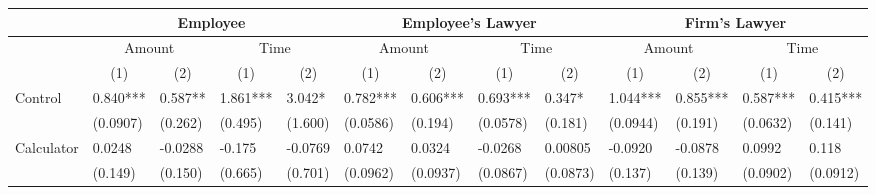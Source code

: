 \begin{tabular}{rrrrrrrrrrrrr}
\toprule
      & \multicolumn{4}{c}{Employee}  & \multicolumn{4}{c}{Employee's Lawyer} & \multicolumn{4}{c}{Firm's Lawyer} \\
\midrule
      & \multicolumn{2}{c}{Amount} & \multicolumn{2}{c}{Time} & \multicolumn{2}{c}{Amount} & \multicolumn{2}{c}{Time} & \multicolumn{2}{c}{Amount} & \multicolumn{2}{c}{Time} \\
      & \multicolumn{1}{c}{(1)} & \multicolumn{1}{c}{(2)} & \multicolumn{1}{c}{(1)} & \multicolumn{1}{c}{(2)} & \multicolumn{1}{c}{(1)} & \multicolumn{1}{c}{(2)} & \multicolumn{1}{c}{(1)} & \multicolumn{1}{c}{(2)} & \multicolumn{1}{c}{(1)} & \multicolumn{1}{c}{(2)} & \multicolumn{1}{c}{(1)} & \multicolumn{1}{c}{(2)} \\
      \midrule
\multicolumn{1}{l}{Control} & \multicolumn{1}{l}{0.840***} & \multicolumn{1}{l}{0.587**} & \multicolumn{1}{l}{1.861***} & \multicolumn{1}{l}{3.042*} & \multicolumn{1}{l}{0.782***} & \multicolumn{1}{l}{0.606***} & \multicolumn{1}{l}{0.693***} & \multicolumn{1}{l}{0.347*} & \multicolumn{1}{l}{1.044***} & \multicolumn{1}{l}{0.855***} & \multicolumn{1}{l}{0.587***} & \multicolumn{1}{l}{0.415***} \\
\multicolumn{1}{l}{} & \multicolumn{1}{l}{(0.0907)} & \multicolumn{1}{l}{(0.262)} & \multicolumn{1}{l}{(0.495)} & \multicolumn{1}{l}{(1.600)} & \multicolumn{1}{l}{(0.0586)} & \multicolumn{1}{l}{(0.194)} & \multicolumn{1}{l}{(0.0578)} & \multicolumn{1}{l}{(0.181)} & \multicolumn{1}{l}{(0.0944)} & \multicolumn{1}{l}{(0.191)} & \multicolumn{1}{l}{(0.0632)} & \multicolumn{1}{l}{(0.141)} \\
\multicolumn{1}{l}{Calculator} & \multicolumn{1}{l}{0.0248} & \multicolumn{1}{l}{-0.0288} & \multicolumn{1}{l}{-0.175} & \multicolumn{1}{l}{-0.0769} & \multicolumn{1}{l}{0.0742} & \multicolumn{1}{l}{0.0324} & \multicolumn{1}{l}{-0.0268} & \multicolumn{1}{l}{0.00805} & \multicolumn{1}{l}{-0.0920} & \multicolumn{1}{l}{-0.0878} & \multicolumn{1}{l}{0.0992} & \multicolumn{1}{l}{0.118} \\
\multicolumn{1}{l}{} & \multicolumn{1}{l}{(0.149)} & \multicolumn{1}{l}{(0.150)} & \multicolumn{1}{l}{(0.665)} & \multicolumn{1}{l}{(0.701)} & \multicolumn{1}{l}{(0.0962)} & \multicolumn{1}{l}{(0.0937)} & \multicolumn{1}{l}{(0.0867)} & \multicolumn{1}{l}{(0.0873)} & \multicolumn{1}{l}{(0.137)} & \multicolumn{1}{l}{(0.139)} & \multicolumn{1}{l}{(0.0902)} & \multicolumn{1}{l}{(0.0912)} \\

\end{tabular}

